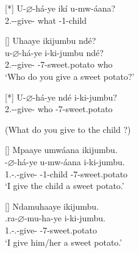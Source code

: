 \documentclass[output=paper]{langscibook}
\begin{document}
\ex
\begin{xlist}
\exi{\CJ}
[*]{
\gll
U-$\varnothing$-há-ye  ikí  u-mw-áana?\\
2\SG.\SM-\PRS{}-give-\PFV{}  what  \AUG{}-1-child\\
\glt
}
\end{xlist}


\z
\z


\ea
\ea
\begin{xlist}
\exi{\CJ}
[]{
\label{bkm:Ref79838134}
Uhaaye ikijumbu ndé?\\
\gll
u-$\varnothing$-há-ye  i-ki-jumbu  ndé?\\
2\SG.\SM-\PRS{}-give-\PFV{}  \AUG{}-7-sweet.potato  who\\
\glt
‘Who do you give a sweet potato?’\\
}
\end{xlist}

\ex
\begin{xlist}
\exi{\CJ}
[*]{
\gll
U-$\varnothing$-há-ye  ndé  i-ki-jumbu?\\
2\SG.\SM-\PRS{}-give-\PFV{}  who \AUG{}-7-sweet.potato\\
\glt
}
\end{xlist}

\z
\z

\ea
\label{bkm:Ref72332345}
(What do you give to the child ?)
\ea
\begin{xlist}
\exi{\CJ{}}
[]{
Mpaaye umwáana ikijumbu.\\
\gll
\N{}-$\varnothing$-há-ye  u-mw-áana  i-ki-jumbu.\\
1\SG.\SM-\PRS.\CJ{}-give-\PFV{}  \AUG{}-1-child  \AUG{}-7-sweet.potato\\
\glt
‘I give the child a sweet potato.’\\
}
\end{xlist}
\pagebreak
\ex
\begin{xlist}
\exi{\CJ{}}
[]{
Ndamuhaaye ikijumbu.\\
\gll
\N{}.ra-$\varnothing$-mu-ha-ye  i-ki-jumbu.\\
1\SG.\SM-\PRS.\OM-{}give-\PFV{}  \AUG{}-7-sweet.potato\\
\glt
‘I give him/her a sweet potato.’\\
}
\end{xlist}
\end{document}
